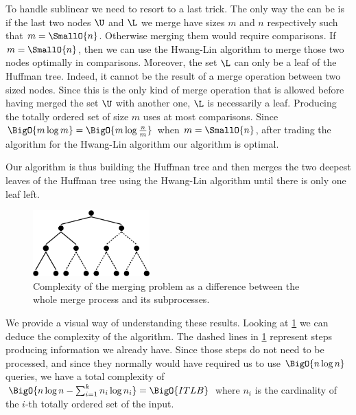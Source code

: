 To handle sublinear  we need to resort to a last trick. The only
way the  can be  is if the last two nodes \(\U\) and
\(\L\) we merge have sizes \(m\) and \(n\) respectively such that \(m =
\SmallO{n}\). Otherwise merging them would require  comparisons.
If \(m = \SmallO{n}\), then we can use the Hwang-Lin algorithm to merge those
two nodes optimally in  comparisons. Moreover, the set
\(\L\) can only be a leaf of the Huffman tree. Indeed, it cannot be the result
of a merge operation between two  sized nodes. Since this is the only
kind of merge operation that is allowed before having merged the set \(\U\)
with another one, \(\L\) is necessarily a leaf.  Producing the totally ordered
set of size \(m\) uses at most  comparisons. Since \(\BigO{m
\log m} = \BigO{m \log \frac{n}{m}}\) when \(m = \SmallO{n}\), after trading
the \tapemerge algorithm for the Hwang-Lin algorithm our algorithm is optimal.

Our algorithm is thus building the Huffman tree and then merges the two deepest
leaves of the Huffman tree using the Hwang-Lin algorithm until there is only
one leaf left.

\begin{figure}
	\centering
	\includegraphics[width=0.4\textwidth]{fig/merging/huffman-2-trim}
	\caption{Complexity of the merging problem as a difference between the whole merge process and its subprocesses.}
	\label{tree:merging:fig/huffman-2}
\end{figure}

We provide a visual way of understanding these results. Looking at
\ref{tree:merging:fig/huffman-2} we can deduce the complexity of the algorithm.
The dashed lines in \ref{tree:merging:fig/huffman-2} represent steps producing
information we already have. Since those steps do not need to be processed, and
since they normally would have required us to use \(\BigO{n \log n}\) queries, we have a
total complexity of $\BigO{n \log n - \sum_{i=1}^{k} n_i \log n_i} =
\BigO{ITLB}$ where $n_i$ is the cardinality of the $i$-th totally ordered set
of the input.

